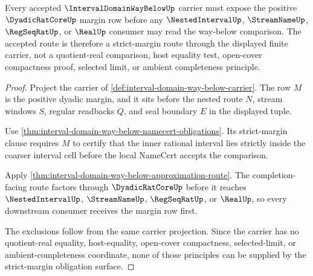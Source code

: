 \begin{theorem}
\label{thm:interval-domain-way-below-obligation-margin-scope}
Every accepted $\IntervalDomainWayBelowUp$ carrier must expose the positive $\DyadicRatCoreUp$ margin row before any $\NestedIntervalUp$, $\StreamNameUp$, $\RegSeqRatUp$, or $\RealUp$ consumer may read the way-below comparison. The accepted route is therefore a strict-margin route through the displayed finite carrier, not a quotient-real comparison, host equality test, open-cover compactness proof, selected limit, or ambient completeness principle.
\end{theorem}
\begin{proof}
Project the carrier of \autoref{def:interval-domain-way-below-carrier}. The row $M$ is the positive dyadic margin, and it sits before the nested route $N$, stream windows $S$, regular readbacks $Q$, and seal boundary $E$ in the displayed tuple.

Use \autoref{thm:interval-domain-way-below-namecert-obligations}. Its strict-margin clause requires $M$ to certify that the inner rational interval lies strictly inside the coarser interval cell before the local NameCert accepts the comparison.

Apply \autoref{thm:interval-domain-way-below-approximation-route}. The completion-facing route factors through $\DyadicRatCoreUp$ before it reaches $\NestedIntervalUp$, $\StreamNameUp$, $\RegSeqRatUp$, or $\RealUp$, so every downstream consumer receives the margin row first.

The exclusions follow from the same carrier projection. Since the carrier has no quotient-real equality, host-equality, open-cover compactness, selected-limit, or ambient-completeness coordinate, none of those principles can be supplied by the strict-margin obligation surface.
\end{proof}

